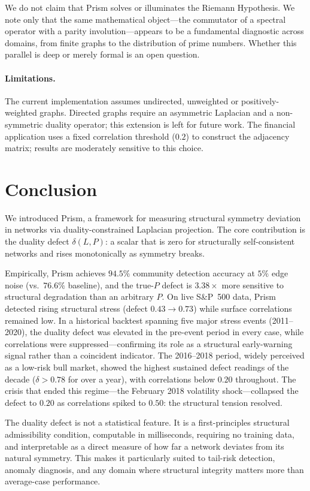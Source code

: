 \documentclass[11pt]{article}
\begin{document}
We do not claim that Prism solves or illuminates the Riemann Hypothesis.
We note only that the same mathematical object---the commutator of a
spectral operator with a parity involution---appears to be a
fundamental diagnostic across domains, from finite graphs to the
distribution of prime numbers.
Whether this parallel is deep or merely formal is an open question.

\paragraph{Limitations.}
The current implementation assumes undirected, unweighted or
positively-weighted graphs.
Directed graphs require an asymmetric Laplacian and a non-symmetric
duality operator; this extension is left for future work.
The financial application uses a fixed correlation threshold ($0.2$)
to construct the adjacency matrix; results are moderately sensitive
to this choice.

\section{Conclusion}

We introduced Prism, a framework for measuring structural symmetry
deviation in networks via duality-constrained Laplacian projection.
The core contribution is the duality defect $\delta(L, P)$: a scalar
that is zero for structurally self-consistent networks and rises
monotonically as symmetry breaks.

Empirically, Prism achieves $94.5\%$ community detection accuracy at
$5\%$ edge noise (vs.\ $76.6\%$ baseline), and the true-$P$ defect is
$3.38\times$ more sensitive to structural degradation than an arbitrary
$P$.
On live S\&P~500 data, Prism detected rising structural stress
(defect $0.43 \to 0.73$) while surface correlations remained low.
In a historical backtest spanning five major stress events (2011--2020),
the duality defect was elevated in the pre-event period in every case,
while correlations were suppressed---confirming its role as a structural
early-warning signal rather than a coincident indicator.
The 2016--2018 period, widely perceived as a low-risk bull market,
showed the highest sustained defect readings of the decade ($\delta >
0.78$ for over a year), with correlations below $0.20$ throughout.
The crisis that ended this regime---the February 2018 volatility
shock---collapsed the defect to $0.20$ as correlations spiked to
$0.50$: the structural tension resolved.

The duality defect is not a statistical feature.
It is a first-principles structural admissibility condition, computable
in milliseconds, requiring no training data, and interpretable as a
direct measure of how far a network deviates from its natural symmetry.
This makes it particularly suited to tail-risk detection, anomaly
diagnosis, and any domain where structural integrity matters more than
average-case performance.



\end{document}
